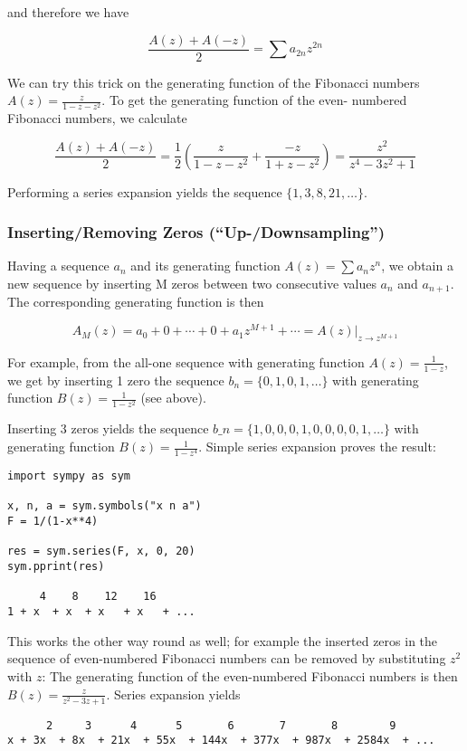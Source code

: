 and therefore we have

\[ \frac{A(z) + A(-z)}{2} = \sum a_{2n}z^{2n} \]

We can try this trick on the generating function of the Fibonacci numbers $A(z) = \frac{z}{1-z-z^2}$. To get the generating function of the even- numbered Fibonacci numbers, we calculate

\[ \frac{A(z) + A(-z)}{2} = \frac{1}{2} \left( \frac{z}{1-z-z^2} + \frac{-z}{1+z-z^2} \right) = \frac{z^2}{z^4 - 3z^2 + 1}\]

Performing a series expansion yields the sequence $\{1, 3, 8, 21, \ldots \}$.

\subsubsection{Inserting/Removing Zeros (``Up-/Downsampling'')}

Having a sequence $a_n$ and its generating function $A(z) = \sum a_n z^n$, we obtain a new sequence by inserting M zeros between two consecutive values $a_n$ and $a_{n+1}$. The corresponding generating function is then

\[ A_M(z) = a_0 + 0 + \cdots + 0 + a_1 z^{M+1} + \cdots = A(z)\big|_{z \rightarrow z^{M+1}}\]

For example, from the all-one sequence with generating function $A(z) = \frac{1}{1-z}$, we get by inserting 1 zero the sequence $b_n = \{0, 1, 0, 1,\ldots\}$ with generating function $B(z) = \frac{1}{1-z^2}$ (see above).

Inserting 3 zeros yields the sequence $b\_n = \{1, 0, 0, 0, 1, 0, 0, 0, 0, 1, \ldots\}$ with generating function $B(z) = \frac{1}{1-z^4}$. Simple series expansion proves the result:

\begin{verbatim}
import sympy as sym

x, n, a = sym.symbols("x n a")
F = 1/(1-x**4)

res = sym.series(F, x, 0, 20)
sym.pprint(res)

     4    8    12    16
1 + x  + x  + x   + x   + ...
\end{verbatim}

This works the other way round as well; for example the inserted zeros in the sequence of even-numbered Fibonacci numbers can be removed by substituting $z^2$ with $z$: The generating function of the even-numbered Fibonacci numbers is then $B(z) = \frac{z}{z^2 - 3z + 1}$. Series expansion yields

\begin{verbatim}
      2     3      4      5       6       7       8        9
x + 3x  + 8x  + 21x  + 55x  + 144x  + 377x  + 987x  + 2584x  + ...
\end{verbatim}
